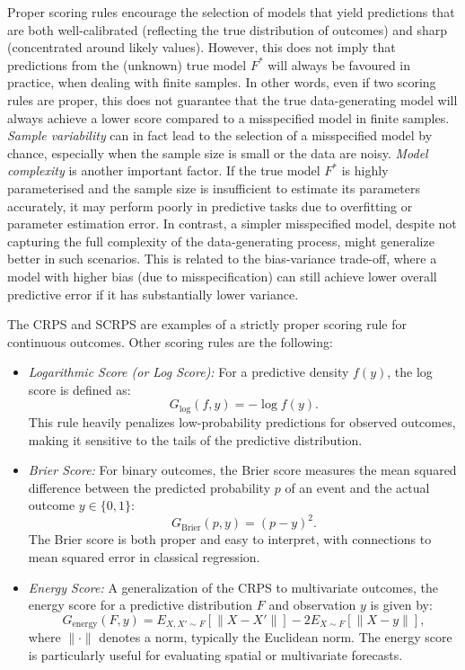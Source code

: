 \documentclass[
  letterpaper,
]{krantz}
\begin{document}
Proper scoring rules encourage the selection of models that yield
predictions that are both well-calibrated (reflecting the true
distribution of outcomes) and sharp (concentrated around likely values).
However, this does not imply that predictions from the (unknown) true
model \(F^*\) will always be favoured in practice, when dealing with
finite samples. In other words, even if two scoring rules are proper,
this does not guarantee that the true data-generating model will always
achieve a lower score compared to a misspecified model in finite
samples. \emph{Sample variability} can in fact lead to the selection of
a misspecified model by chance, especially when the sample size is small
or the data are noisy. \emph{Model complexity} is another important
factor. If the true model \(F^*\) is highly parameterised and the sample
size is insufficient to estimate its parameters accurately, it may
perform poorly in predictive tasks due to overfitting or parameter
estimation error. In contrast, a simpler misspecified model, despite not
capturing the full complexity of the data-generating process, might
generalize better in such scenarios. This is related to the
bias-variance trade-off, where a model with higher bias (due to
misspecification) can still achieve lower overall predictive error if it
has substantially lower variance.

The CRPS and SCRPS are examples of a strictly proper scoring rule for
continuous outcomes. Other scoring rules are the following:

\begin{itemize}
\item
  \emph{Logarithmic Score (or Log Score):} For a predictive density
  \(f(y)\), the log score is defined as: \[
  G_{\text{log}}(f, y) = -\log f(y).
  \] This rule heavily penalizes low-probability predictions for
  observed outcomes, making it sensitive to the tails of the predictive
  distribution.
\item
  \emph{Brier Score:} For binary outcomes, the Brier score measures the
  mean squared difference between the predicted probability \(p\) of an
  event and the actual outcome \(y \in \{0, 1\}\): \[
  G_{\text{Brier}}(p, y) = (p - y)^2.
  \] The Brier score is both proper and easy to interpret, with
  connections to mean squared error in classical regression.
\item
  \emph{Energy Score:} A generalization of the CRPS to multivariate
  outcomes, the energy score for a predictive distribution \(F\) and
  observation \(y\) is given by: \[
  G_{\text{energy}}(F, y) = E_{X, X' \sim F}[\|X - X'\|] - 2 E_{X \sim F}[\|X - y\|],
  \] where \(\|\cdot\|\) denotes a norm, typically the Euclidean norm.
  The energy score is particularly useful for evaluating spatial or
  multivariate forecasts.
\end{itemize}
\end{document}
